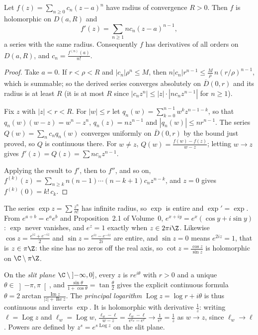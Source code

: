 \begin{theorem}\label{thm:powerseries}
Let $f(z)=\sum_{n\ge0}c_n(z-a)^n$ have radius of convergence $R>0$. Then $f$ is holomorphic on $D(a,R)$ and
\[
f'(z)=\sum_{n\ge1}nc_n(z-a)^{n-1},
\]
a series with the same radius. Consequently $f$ has derivatives of all orders on $D(a,R)$, and $c_n=\frac{f^{(n)}(a)}{n!}$.
\end{theorem}
\begin{proof}
Take $a=0$. If $r<\rho<R$ and $|c_n|\rho^n\le M$, then $n|c_n|r^{n-1}\le\frac M\rho\,n(r/\rho)^{n-1}$, which is summable; so the derived series
converges absolutely on $\overline D(0,r)$ and its radius is at least $R$ (it is at most $R$ since $|c_nz^n|\le|z|\cdot|nc_nz^{n-1}|$ for
$n\ge1$).

Fix $z$ with $|z|<r<R$. For $|w|\le r$ let $q_n(w)=\sum_{k=0}^{n-1}w^kz^{n-1-k}$, so that $q_n(w)(w-z)=w^n-z^n$, $q_n(z)=nz^{n-1}$
and $|q_n(w)|\le nr^{n-1}$. The series $Q(w)=\sum_nc_nq_n(w)$ converges uniformly on $\overline D(0,r)$ by the bound just proved, so
$Q$ is continuous there. For $w\ne z$, $Q(w)=\frac{f(w)-f(z)}{w-z}$; letting $w\to z$ gives $f'(z)=Q(z)=\sum nc_nz^{n-1}$.

Applying the result to $f'$, then to $f''$, and so on, $f^{(k)}(z)=\sum_{n\ge k}n(n-1)\cdots(n-k+1)c_nz^{n-k}$, and $z=0$ gives
$f^{(k)}(0)=k!\,c_k$.
\end{proof}

\begin{example}
The series $\exp z=\sum\frac{z^n}{n!}$ has infinite radius, so $\exp$ is entire and $\exp'=\exp$. From $e^{a+b}=e^ae^b$ and
Proposition~2.1 of Volume~0, $e^{x+iy}=e^x(\cos y+i\sin y)$: $\exp$ never vanishes, and $e^z=1$ exactly when $z\in2\pi i\Z$.
Likewise $\cos z=\frac{e^{iz}+e^{-iz}}2$ and $\sin z=\frac{e^{iz}-e^{-iz}}{2i}$ are entire, and $\sin z=0$ means $e^{2iz}=1$, that is
$z\in\pi\Z$: the sine has no zeros off the real axis, so $\cot z=\frac{\cos z}{\sin z}$ is holomorphic on $\C\setminus\pi\Z$.

On the \emph{slit plane} $\C\setminus\left]-\infty,0\right]$, every $z$ is $re^{i\theta}$ with $r>0$ and a unique $\theta\in\left]-\pi,\pi\right[$, and
$\frac{\sin\theta}{1+\cos\theta}=\tan\frac\theta2$ gives the explicit continuous formula $\theta=2\arctan\frac{\operatorname{Im}z}{|z|+\operatorname{Re}z}$. The
\emph{principal logarithm} $\operatorname{Log}z=\log r+i\theta$ is thus continuous and inverts $\exp$. It is holomorphic with derivative
$\frac1z$: writing $\ell=\operatorname{Log}z$ and $\ell_w=\operatorname{Log}w$, $\frac{\ell_w-\ell}{w-z}=\frac{\ell_w-\ell}{e^{\ell_w}-e^\ell}\to\frac1{e^\ell}=\frac1z$ as $w\to z$,
since $\ell_w\to\ell$. Powers are defined by $z^s=e^{s\operatorname{Log}z}$ on the slit plane.
\end{example}

